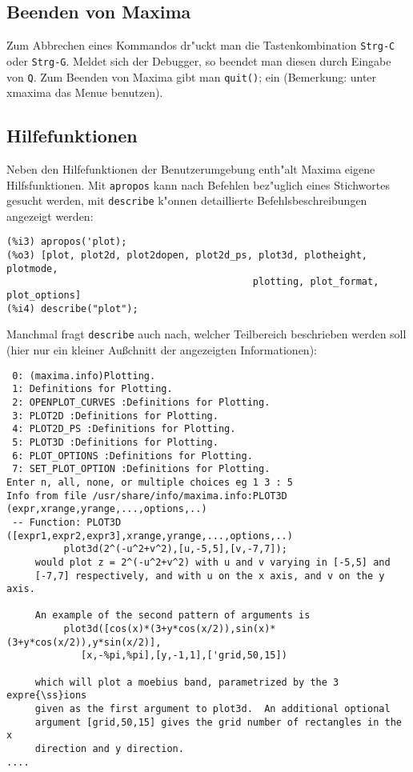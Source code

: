 \documentclass[spanish,12pt,a4paper]{article}
\begin{document}
\subsection{Beenden von Maxima}


Zum Abbrechen eines Kommandos dr"uckt man die Tastenkombination \verb|Strg-C| oder \verb|Strg-G|. Meldet sich der Debugger, so beendet man diesen durch Eingabe von \verb|Q|.
Zum Beenden von Maxima gibt man \verb|quit()|; ein (Bemerkung: unter xmaxima das Menue benutzen).


\subsection{Hilfefunktionen}

Neben den Hilfefunktionen der Benutzerumgebung enth"alt Maxima eigene Hilfsfunktionen. Mit \verb|apropos| kann nach Befehlen bez"uglich eines Stichwortes gesucht werden, mit \verb|describe| k"onnen detaillierte Befehlsbeschreibungen angezeigt werden:

\scriptsize
\begin{verbatim}
(%i3) apropos('plot);
(%o3) [plot, plot2d, plot2dopen, plot2d_ps, plot3d, plotheight, plotmode, 
                                           plotting, plot_format, plot_options]
(%i4) describe("plot");
\end{verbatim}
\normalsize

Manchmal fragt \verb|describe| auch nach, welcher Teilbereich beschrieben werden soll (hier nur ein kleiner Au{\ss}chnitt der angezeigten Informationen):
\scriptsize
\begin{verbatim}
 0: (maxima.info)Plotting.
 1: Definitions for Plotting.
 2: OPENPLOT_CURVES :Definitions for Plotting.
 3: PLOT2D :Definitions for Plotting.
 4: PLOT2D_PS :Definitions for Plotting.
 5: PLOT3D :Definitions for Plotting.
 6: PLOT_OPTIONS :Definitions for Plotting.
 7: SET_PLOT_OPTION :Definitions for Plotting.
Enter n, all, none, or multiple choices eg 1 3 : 5
Info from file /usr/share/info/maxima.info:PLOT3D (expr,xrange,yrange,...,options,..)
 -- Function: PLOT3D ([expr1,expr2,expr3],xrange,yrange,...,options,..)
          plot3d(2^(-u^2+v^2),[u,-5,5],[v,-7,7]);
     would plot z = 2^(-u^2+v^2) with u and v varying in [-5,5] and
     [-7,7] respectively, and with u on the x axis, and v on the y axis.

     An example of the second pattern of arguments is
          plot3d([cos(x)*(3+y*cos(x/2)),sin(x)*(3+y*cos(x/2)),y*sin(x/2)],
             [x,-%pi,%pi],[y,-1,1],['grid,50,15])

     which will plot a moebius band, parametrized by the 3 expre{\ss}ions
     given as the first argument to plot3d.  An additional optional
     argument [grid,50,15] gives the grid number of rectangles in the x
     direction and y direction.
....
\end{verbatim}
\normalsize
\end{document}
